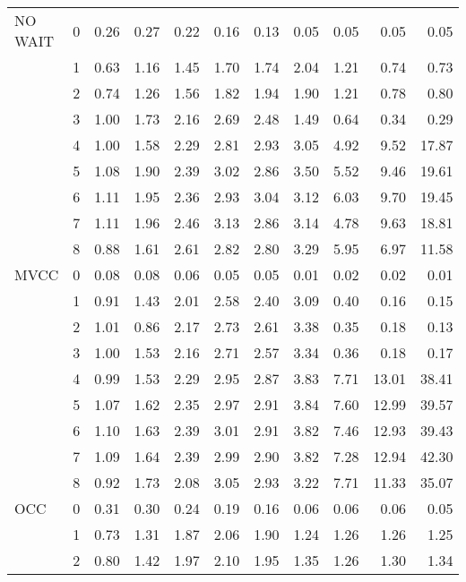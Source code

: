 \begin{tabular}{llrrrrrrrrr}
NO WAIT & 0 &  0.26 &  0.27 &  0.22 &  0.16 &  0.13 &  0.05 &  0.05 &  0.05 &  0.05 \\
       & 1 &  0.63 &  1.16 &  1.45 &  1.70 &  1.74 &  2.04 &  1.21 &  0.74 &  0.73 \\
       & 2 &  0.74 &  1.26 &  1.56 &  1.82 &  1.94 &  1.90 &  1.21 &  0.78 &  0.80 \\
       & 3 &  1.00 &  1.73 &  2.16 &  2.69 &  2.48 &  1.49 &  0.64 &  0.34 &  0.29 \\
       & 4 &  1.00 &  1.58 &  2.29 &  2.81 &  2.93 &  3.05 &  4.92 &  9.52 & 17.87 \\
       & 5 &  1.08 &  1.90 &  2.39 &  3.02 &  2.86 &  3.50 &  5.52 &  9.46 & 19.61 \\
       & 6 &  1.11 &  1.95 &  2.36 &  2.93 &  3.04 &  3.12 &  6.03 &  9.70 & 19.45 \\
       & 7 &  1.11 &  1.96 &  2.46 &  3.13 &  2.86 &  3.14 &  4.78 &  9.63 & 18.81 \\
       & 8 &  0.88 &  1.61 &  2.61 &  2.82 &  2.80 &  3.29 &  5.95 &  6.97 & 11.58 \\
MVCC & 0 &  0.08 &  0.08 &  0.06 &  0.05 &  0.05 &  0.01 &  0.02 &  0.02 &  0.01 \\
       & 1 &  0.91 &  1.43 &  2.01 &  2.58 &  2.40 &  3.09 &  0.40 &  0.16 &  0.15 \\
       & 2 &  1.01 &  0.86 &  2.17 &  2.73 &  2.61 &  3.38 &  0.35 &  0.18 &  0.13 \\
       & 3 &  1.00 &  1.53 &  2.16 &  2.71 &  2.57 &  3.34 &  0.36 &  0.18 &  0.17 \\
       & 4 &  0.99 &  1.53 &  2.29 &  2.95 &  2.87 &  3.83 &  7.71 & 13.01 & 38.41 \\
       & 5 &  1.07 &  1.62 &  2.35 &  2.97 &  2.91 &  3.84 &  7.60 & 12.99 & 39.57 \\
       & 6 &  1.10 &  1.63 &  2.39 &  3.01 &  2.91 &  3.82 &  7.46 & 12.93 & 39.43 \\
       & 7 &  1.09 &  1.64 &  2.39 &  2.99 &  2.90 &  3.82 &  7.28 & 12.94 & 42.30 \\
       & 8 &  0.92 &  1.73 &  2.08 &  3.05 &  2.93 &  3.22 &  7.71 & 11.33 & 35.07 \\
OCC & 0 &  0.31 &  0.30 &  0.24 &  0.19 &  0.16 &  0.06 &  0.06 &  0.06 &  0.05 \\
       & 1 &  0.73 &  1.31 &  1.87 &  2.06 &  1.90 &  1.24 &  1.26 &  1.26 &  1.25 \\
       & 2 &  0.80 &  1.42 &  1.97 &  2.10 &  1.95 &  1.35 &  1.26 &  1.30 &  1.34 \\

\end{tabular}
